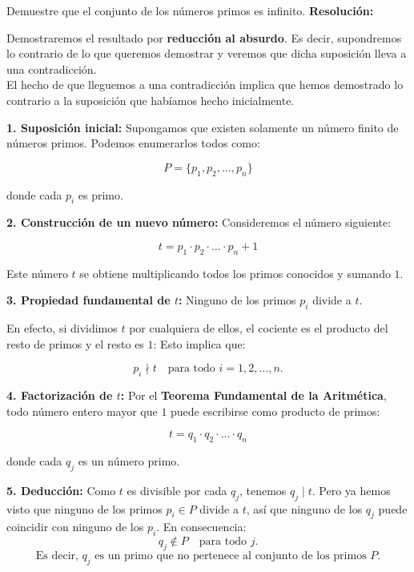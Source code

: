 \documentclass[a4paper,12pt]{article}
\begin{document}
\begin{ejercicio}[title=Ejercicio 14]
Demuestre que el conjunto de los números primos es infinito.
\tcblower
\textbf{Resolución:}

Demostraremos el resultado por \textbf{reducción al absurdo}.  
Es decir, supondremos lo contrario de lo que queremos demostrar y veremos que dicha suposición lleva a una contradicción.\\
El hecho de que lleguemos a una contradicción implica que hemos demostrado lo contrario a la suposición que habíamos hecho inicialmente.

\vspace{0.5em}

\textbf{1. Suposición inicial:}  
Supongamos que existen solamente un número finito de números primos.  
Podemos enumerarlos todos como:

\[
P = \{p_1, p_2, \dots, p_n\}
\]

donde cada $p_i$ es primo.

\vspace{0.5em}

\textbf{2. Construcción de un nuevo número:}  
Consideremos el número siguiente:

\[
t = p_1 \cdot p_2 \cdot \dots \cdot p_n + 1
\]

Este número $t$ se obtiene multiplicando todos los primos conocidos y sumando $1$.

\vspace{0.5em}

\textbf{3. Propiedad fundamental de $t$:}  
Ninguno de los primos $p_i$ divide a $t$.

En efecto, si dividimos $t$ por cualquiera de ellos, el cociente es el producto del resto de primos y el resto es $1$:
Esto implica que:

\[
p_i \nmid t \quad \text{para todo } i = 1, 2, \dots, n.
\]

\vspace{0.5em}

\textbf{4. Factorización de $t$:}  
Por el \textbf{Teorema Fundamental de la Aritmética}, todo número entero mayor que $1$ puede escribirse como producto de primos:

\[
t = q_1 \cdot q_2 \cdot \dots \cdot q_n
\]

donde cada $q_j$ es un número primo.

\vspace{0.5em}

\textbf{5. Deducción:}  
Como $t$ es divisible por cada $q_j$, tenemos $q_j \mid t$.  
Pero ya hemos visto que ninguno de los primos $p_i \in P$ divide a $t$, así que ninguno de los $q_j$ puede coincidir con ninguno de los $p_i$.  
En consecuencia:
\[
q_j \notin P \quad \text{para todo } j.
\]
\[
\text{Es decir, $q_j$ es un primo que no pertenece al conjunto de los primos $P$.}
\]


\end{ejercicio}
\end{document}
